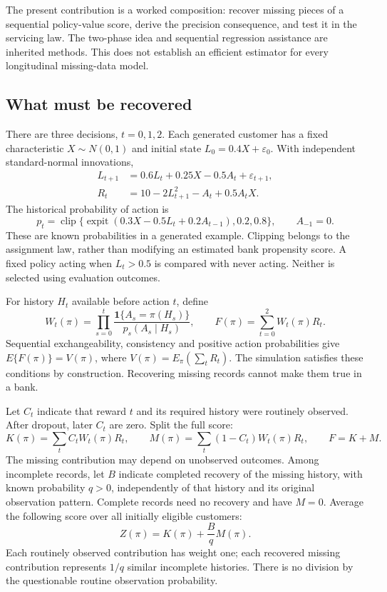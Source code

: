 The present contribution is a worked composition: recover missing pieces of
a sequential policy-value score, derive the precision consequence, and test
it in the servicing law. The two-phase idea and sequential regression
assistance are inherited methods. This does not establish an efficient
estimator for every longitudinal missing-data model.

\subsection{What must be recovered}
There are three decisions, $t=0,1,2$. Each generated customer has a fixed
characteristic $X\sim N(0,1)$ and initial state
$L_0=0.4X+\varepsilon_0$. With independent standard-normal innovations,
\begin{align*}
L_{t+1}&=0.6L_t+0.25X-0.5A_t+\varepsilon_{t+1},\\
R_t&=10-2L_{t+1}^{2}-A_t+0.5A_tX.
\end{align*}
The historical probability of action is
\[
p_t=\operatorname{clip}\{\operatorname{expit}(0.3X-0.5L_t+0.2A_{t-1}),
                       0.2,0.8\},\qquad A_{-1}=0.
\]
These are known probabilities in a generated example. Clipping belongs to
the assignment law, rather than modifying an estimated bank propensity
score. A fixed policy acting when $L_t>0.5$ is compared with never acting.
Neither is selected using evaluation outcomes.

For history $H_t$ available before action $t$, define
\[
W_t(\pi)=\prod_{s=0}^{t}
 \frac{\mathbf1\{A_s=\pi(H_s)\}}{p_s(A_s\mid H_s)},
\qquad F(\pi)=\sum_{t=0}^{2}W_t(\pi)R_t.
\]
Sequential exchangeability, consistency and positive action probabilities
give $E\{F(\pi)\}=V(\pi)$, where
$V(\pi)=E_\pi(\sum_t R_t)$. The simulation satisfies these conditions by
construction. Recovering missing records cannot make them true in a bank.

Let $C_t$ indicate that reward $t$ and its required history were routinely
observed. After dropout, later $C_t$ are zero. Split the full score:
\[
K(\pi)=\sum_t C_tW_t(\pi)R_t,\qquad
M(\pi)=\sum_t(1-C_t)W_t(\pi)R_t,\qquad F=K+M.
\]
The missing contribution may depend on unobserved outcomes. Among incomplete
records, let $B$ indicate completed recovery of the missing history, with
known probability $q>0$, independently of that history and its original
observation pattern. Complete records need no recovery and have $M=0$.
Average the following score over all initially eligible customers:
\begin{equation}
Z(\pi)=K(\pi)+\frac{B}{q}M(\pi).
\label{closure30:audit-score}
\end{equation}
Each routinely observed contribution has weight one; each recovered missing
contribution represents $1/q$ similar incomplete histories. There is no
division by the questionable routine observation probability.


